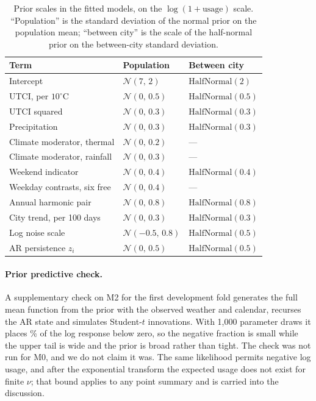 \documentclass{article}
\begin{document}
\begin{table}[t]
\centering
\footnotesize
\caption{Prior scales in the fitted models, on the $\log(1+\text{usage})$ scale. ``Population'' is
the standard deviation of the normal prior on the population mean; ``between city'' is the scale of
the half-normal prior on the between-city standard deviation.}
\label{tab:priors}
\begin{tabular}{lll}
\toprule
Term & Population & Between city \\
\midrule
Intercept & $\mathcal{N}(7,\,2)$ & $\text{HalfNormal}(2)$ \\
UTCI, per $10^\circ$C & $\mathcal{N}(0,\,0.5)$ & $\text{HalfNormal}(0.5)$ \\
UTCI squared & $\mathcal{N}(0,\,0.3)$ & $\text{HalfNormal}(0.3)$ \\
Precipitation & $\mathcal{N}(0,\,0.3)$ & $\text{HalfNormal}(0.3)$ \\
Climate moderator, thermal & $\mathcal{N}(0,\,0.2)$ & --- \\
Climate moderator, rainfall & $\mathcal{N}(0,\,0.3)$ & --- \\
Weekend indicator & $\mathcal{N}(0,\,0.4)$ & $\text{HalfNormal}(0.4)$ \\
Weekday contrasts, six free & $\mathcal{N}(0,\,0.4)$ & --- \\
Annual harmonic pair & $\mathcal{N}(0,\,0.8)$ & $\text{HalfNormal}(0.8)$ \\
City trend, per 100 days & $\mathcal{N}(0,\,0.3)$ & $\text{HalfNormal}(0.3)$ \\
Log noise scale & $\mathcal{N}(-0.5,\,0.8)$ & $\text{HalfNormal}(0.5)$ \\
AR persistence $z_i$ & $\mathcal{N}(0,\,0.5)$ & $\text{HalfNormal}(0.5)$ \\
\bottomrule
\end{tabular}
\end{table}

\paragraph{Prior predictive check.}
A supplementary check on M2 for the first development fold generates the full mean function from the
prior with the observed weather and calendar, recurses the AR state and simulates Student-$t$
innovations. With 1{,}000 parameter draws it places \PriorNegJoint\% of the log response below zero,
so the negative fraction is small while the upper tail is wide and the prior is broad rather than
tight. The check was not run for M0, and we do not claim it was. The same likelihood permits negative
log usage, and after the exponential transform the expected usage does not exist for finite $\nu$;
that bound applies to any point summary and is carried into the discussion.
\end{document}
